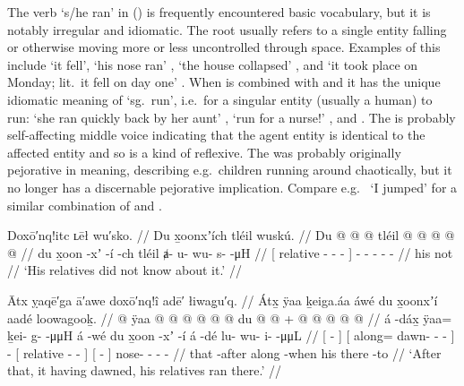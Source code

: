 The verb  ‘s/he ran’ in (\lastx) is frequently encountered basic vocabulary, but it is notably irregular and idiomatic.
The root  usually refers to a single entity falling or otherwise moving more or less uncontrolled through space.
Examples of this include  ‘it fell’,  ‘his nose ran’ \parencite[38.354]{story-naish:1973},  ‘the house collapsed’ \parencite[51.560]{story-naish:1973}, and  ‘it took place on Monday; lit.\ it fell on day one’ \parencite[223.3134]{story-naish:1973}.
When  is combined with  and  it has the unique idiomatic meaning of ‘sg.\ run’, i.e.\ for a singular entity (usually a human) to run:  ‘she ran quickly back by her aunt’ \parencite[177.2444]{story-naish:1973},  ‘run for a nurse!’ \parencite[88.1104]{story-naish:1973}, and  \parencite[f03/99]{leer:1973}.
The  is probably self-affecting middle voice indicating that the agent entity is identical to the affected entity and so is a kind of reflexive.
The  was probably originally pejorative in meaning, describing e.g.\ children running around chaotically, but it no longer has a discernable pejorative implication.
Compare e.g.\  ‘I jumped’ for a similar combination of  and .

\ex\label{ex:93-39-relatives-dont-know}%
%
\begingl
	\glpreamble	Doxō′nq!itc ʟēł wu′sko. //
	\glpreamble	Du x̱oonxʼích tléil wuskú. //
	\gla	{} Du  @ {} @ {} @ {} {}
		tléil  @ {} @ {} @ {} @ {} @ {} //
	\glb	{} du x̱oon -xʼ -í -ch {}
		tléil ⱥ- u- wu- s-  -μH //
	\glc	{}[  relative - - - {}]
		 - - - -  - //
	\gld	{} his  {} {} {} {}
		not  {} {} {} {} {} //
	\glft	‘His relatives did not know about it.’
		//
\endgl
\xe

\ex\label{ex:93-40-dawned-they-ran-there}%
%
\begingl
	\glpreamble	Ātx ỵaqē′ga ā′awe doxō′nq!î adē′ łiwag̣u′q. //
	\glpreamble	Átx̱ ÿaa ḵeiga.áa áwé du x̱oonxʼí aadé loowagooḵ. //
	\gla	{}  @ {} {}
		{} ÿaa @  @ {} @ {} @ {} @ {} {}
		 @ {}
		{} du  @ {} @ {} {} +
		{}  @ {} {}
		 @ {} @ {} @ {} @ {} //
	\glb	{} á -dáx̱ {}
		{} ÿaa= ḵei- g-  -μμH {} {}
		á -wé
		{} du x̱oon -xʼ -í {}
		{} á -dé {}
		lu- wu- i-  -μμL //
	\glc	{}[  - {}]
		{}[ along= dawn- -  - \· {}]
		 -
		{}[  relative - - {}]
		{}[  - {}]
		nose- - -  - //
	\gld	{} that -after {}
		{} along  {} {} {} -when {}
		 {}
		{} his  {} {} {}
		{} there -to {}
		 {} {} {} {} //
	\glft	‘After that, it having dawned, his relatives ran there.’
		//
\endgl
\xe

